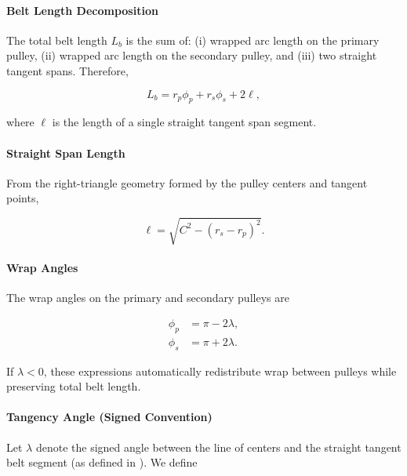 \documentclass[11pt]{article}
\numberwithin{equation}{section}
\begin{document}
\paragraph{Belt Length Decomposition}

The total belt length $L_b$ is the sum of:
(i) wrapped arc length on the primary pulley,
(ii) wrapped arc length on the secondary pulley, and
(iii) two straight tangent spans.
Therefore,

\begin{equation}
L_b = r_p \phi_p + r_s \phi_s + 2\ell,
\label{eq:belt_length_general}
\end{equation}

where $\ell$ is the length of a single straight tangent span segment.

\paragraph{Straight Span Length}

From the right-triangle geometry formed by the pulley centers and tangent points,

\begin{equation}
\ell = \sqrt{C^2 - (r_s - r_p)^2}.
\label{eq:span_length}
\end{equation}

\paragraph{Wrap Angles}

The wrap angles on the primary and secondary pulleys are

\begin{align}
\phi_p &= \pi - 2\lambda, \label{eq:wrap_primary}\\
\phi_s &= \pi + 2\lambda. \label{eq:wrap_secondary}
\end{align} 

If $\lambda < 0$, these expressions automatically redistribute wrap
between pulleys while preserving total belt length.

\paragraph{Tangency Angle (Signed Convention)}

Let $\lambda$ denote the signed angle between the line of centers and the straight
tangent belt segment (as defined in ). We define
\end{document}
